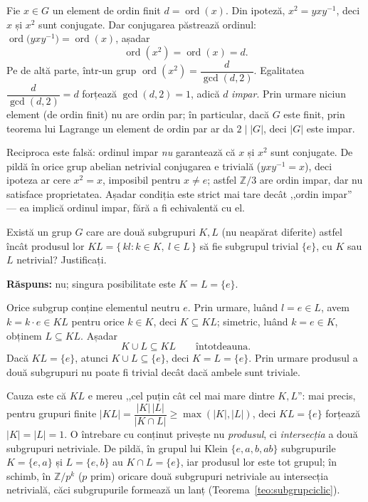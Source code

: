 \begin{solutie}
Fie $x\in G$ un element de ordin finit $d=\operatorname{ord}(x)$. Din
ipoteză, $x^{2}=yxy^{-1}$, deci $x$ și $x^{2}$ sunt conjugate. Dar
conjugarea păstrează ordinul: $\operatorname{ord}\bigl(yxy^{-1}\bigr)=\operatorname{ord}(x)$,
așadar
\[
  \operatorname{ord}(x^{2})=\operatorname{ord}(x)=d .
\]
Pe de altă parte, într-un grup $\operatorname{ord}(x^{2})=\dfrac{d}{\gcd(d,2)}$.
Egalitatea $\dfrac{d}{\gcd(d,2)}=d$ forțează $\gcd(d,2)=1$, adică
$d$ \emph{impar}. Prin urmare niciun element (de ordin finit) nu are ordin
par; în particular, dacă $G$ este finit, prin teorema lui Lagrange
un element de ordin par ar da $2\mid|G|$, deci $|G|$ este impar.
\end{solutie}

\begin{obs}
Reciproca este falsă: ordinul impar \emph{nu} garantează că
$x$ și $x^{2}$ sunt conjugate. De pildă în orice grup abelian
netrivial conjugarea e trivială ($yxy^{-1}=x$), deci ipoteza ar cere
$x^{2}=x$, imposibil pentru $x\neq e$; astfel $\mathbb{Z}/3$ are ordin impar,
dar nu satisface proprietatea. Așadar condiția este strict mai tare
decât ,,ordin impar'' --- ea implică ordinul impar, fără a fi
echivalentă cu el.
\end{obs}

\begin{problema}
Există un grup $G$ care are două subgrupuri $K,L$ (nu neapărat
diferite) astfel încât produsul lor $KL=\{\,kl : k\in K,\ l\in L\,\}$
să fie subgrupul trivial $\{e\}$, cu $K$ sau $L$ netrivial? Justificați.
\end{problema}

\noindent\textbf{Răspuns:} nu; singura posibilitate este $K=L=\{e\}$.

\begin{solutie}
Orice subgrup conține elementul neutru $e$. Prin urmare, luând
$l=e\in L$, avem $k=k\cdot e\in KL$ pentru orice $k\in K$, deci
$K\subseteq KL$; simetric, luând $k=e\in K$, obținem $L\subseteq KL$.
Așadar
\[
  K\cup L\subseteq KL\qquad\text{întotdeauna.}
\]
Dacă $KL=\{e\}$, atunci $K\cup L\subseteq\{e\}$, deci $K=L=\{e\}$. Prin
urmare produsul a două subgrupuri nu poate fi trivial decât dacă
ambele sunt triviale.
\end{solutie}

\begin{obs}
Cauza este că $KL$ e mereu ,,cel puțin cât cel mai mare dintre
$K,L$'': mai precis, pentru grupuri finite
$|KL|=\dfrac{|K|\,|L|}{|K\cap L|}\ge\max(|K|,|L|)$, deci $KL=\{e\}$ forțează
$|K|=|L|=1$. O întrebare cu conținut privește nu \emph{produsul}, ci
\emph{intersecția} a două subgrupuri netriviale. De pildă, în grupul lui
Klein $\{e,a,b,ab\}$ subgrupurile $K=\{e,a\}$ și $L=\{e,b\}$ au
$K\cap L=\{e\}$, iar produsul lor este tot grupul; în schimb, în
$\mathbb{Z}/p^{k}$ ($p$ prim) oricare două subgrupuri netriviale au
intersecția netrivială, căci subgrupurile formează un lanț
(Teorema~\ref{teo:subgrupciclic}).
\end{obs}

